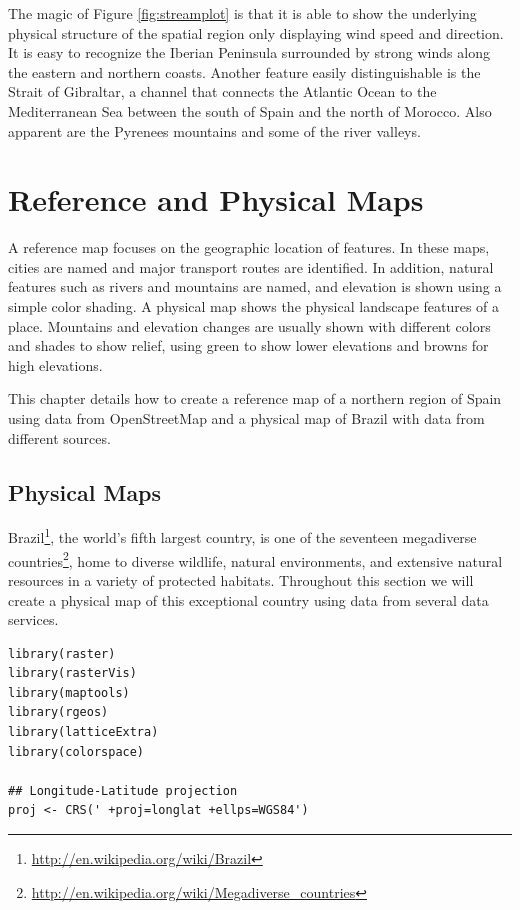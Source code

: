 \documentclass[smallroyalvopaper]{memoir}
\begin{document}
The magic of Figure \ref{fig:streamplot} is that it is able to show the
underlying physical structure of the spatial region only displaying
wind speed and direction. It is easy to recognize the Iberian
Peninsula surrounded by strong winds along the eastern and northern
coasts. Another feature easily distinguishable is the Strait of
Gibraltar, a channel that connects the Atlantic Ocean to the
Mediterranean Sea between the south of Spain and the north of
Morocco. Also apparent are the Pyrenees mountains and some of the
river valleys.

\chapter{Reference and Physical Maps}
\label{sec:orgheadline35}
\label{cha:refer-phys-maps}

A reference map focuses on the geographic location of features. In these maps, cities are named and major transport routes are identified. In addition, natural features such as rivers and mountains are named, and elevation is shown using a simple color shading.
A physical map shows the physical landscape features of a place.  Mountains and elevation changes are usually shown with different colors and shades to show relief, using green to show lower elevations and browns for high elevations.

This chapter details how to create a reference map of a northern region of Spain using data from OpenStreetMap and a physical map of Brazil with data from different sources.
\section{Physical Maps}
\label{sec-1}
Brazil\footnote{\url{http://en.wikipedia.org/wiki/Brazil}}, the world's fifth largest country, is one of the
seventeen megadiverse countries\footnote{\url{http://en.wikipedia.org/wiki/Megadiverse_countries}}, home to diverse wildlife,
natural environments, and extensive natural resources in a variety of
protected habitats. Throughout this section we will create a physical
map of this exceptional country using data from several data services.


\lstset{language=R,numbers=none}
\begin{lstlisting}
library(raster)
library(rasterVis)
library(maptools)
library(rgeos)
library(latticeExtra)
library(colorspace)

## Longitude-Latitude projection
proj <- CRS(' +proj=longlat +ellps=WGS84')
\end{lstlisting}
\end{document}
